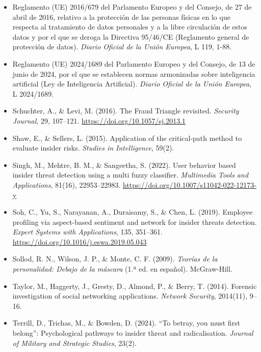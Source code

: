 \documentclass[IB]{TFUOC}%
\begin{document}
\begin{itemize}
    \item Reglamento (UE) 2016/679 del Parlamento Europeo y del Consejo, de 27 de abril de 2016, relativo a la protección de las personas físicas en lo que respecta al tratamiento de datos personales y a la libre circulación de estos datos y por el que se deroga la Directiva 95/46/CE (Reglamento general de protección de datos). 
    \textit{Diario Oficial de la Unión Europea}, L 119, 1-88.

    \item Reglamento (UE) 2024/1689 del Parlamento Europeo y del Consejo, de 13 de junio de 2024, por el que se establecen normas armonizadas sobre inteligencia artificial (Ley de Inteligencia Artificial).
    \textit{Diario Oficial de la Unión Europea}, L 2024/1689.

    \item Schuchter, A., \& Levi, M. (2016). The Fraud Triangle revisited. 
    \textit{Security Journal}, 29, 107--121. 
    \url{https://doi.org/10.1057/sj.2013.1}

    \item Shaw, E., \& Sellers, L. (2015). Application of the critical-path 
    method to evaluate insider risks. \textit{Studies in Intelligence}, 59(2).

    \item Singh, M., Mehtre, B. M., \& Sangeetha, S. (2022). User behavior 
    based insider threat detection using a multi fuzzy classifier. 
    \textit{Multimedia Tools and Applications}, 81(16), 22953--22983. 
    \url{https://doi.org/10.1007/s11042-022-12173-y}

    \item Soh, C., Yu, S., Narayanan, A., Duraisamy, S., \& Chen, L. (2019). 
    Employee profiling via aspect-based sentiment and network for insider 
    threats detection. \textit{Expert Systems with Applications}, 135, 
    351--361. \url{https://doi.org/10.1016/j.eswa.2019.05.043}

    \item Sollod, R. N., Wilson, J. P., \& Monte, C. F. (2009). 
    \textit{Teorías de la personalidad: Debajo de la máscara} (1.ª ed. en 
    español). McGraw-Hill.

    \item Taylor, M., Haggerty, J., Gresty, D., Almond, P., \& Berry, T. 
    (2014). Forensic investigation of social networking applications. 
    \textit{Network Security}, 2014(11), 9--16.

    \item Terrill, D., Trichas, M., \& Bowden, D. (2024). ``To betray, you 
    must first belong'': Psychological pathways to insider threat and 
    radicalisation. \textit{Journal of Military and Strategic Studies}, 
    23(2).


\end{itemize}
\end{document}
